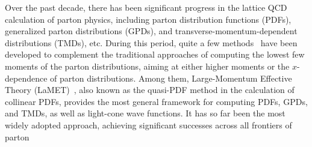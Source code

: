 \documentclass[prd,twocolumn,superscriptaddress,preprintnumbers,showpacs,nofootinbib,notitlepage,floatfix]{revtex4-2}
\begin{document}
Over the past decade, there has been significant progress in the lattice QCD calculation of parton physics, including parton distribution functions (PDFs), generalized parton distributions (GPDs), and transverse-momentum-dependent distributions (TMDs), etc. During this period, quite a few methods~\cite{Liu:1993cv,Detmold:2005gg,Braun:2007wv,Davoudi:2012ya,Ji:2013dva,Radyushkin:2017cyf,Ma:2017pxb,Chambers:2017dov,Shindler:2023xpd} have been developed to complement the traditional approaches of computing the lowest few moments of the parton distributions, aiming at either higher moments or the $x$-dependence of parton distributions. Among them, Large-Momentum Effective Theory (LaMET)~\cite{Ji:2013dva,Ji:2014gla,Ji:2020ect}, also known as the quasi-PDF method in the calculation of collinear PDFs, provides the most general framework for computing PDFs, GPDs, and TMDs, as well as light-cone wave functions. It has so far been the most widely adopted approach, achieving significant successes across all frontiers of parton 
\end{document}
